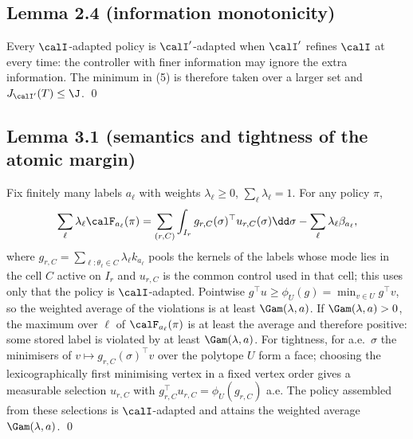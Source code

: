 \subsection{Lemma 2.4 (information monotonicity)}
Every $\calI$-adapted policy is $\calI'$-adapted when $\calI'$ refines $\calI$ at every time: the controller with finer information may ignore the extra information. The minimum in (5) is therefore taken over a larger set and $J_{\calI'}(T)\le\J$. \qed

\subsection{Lemma 3.1 (semantics and tightness of the atomic margin)}
Fix finitely many labels $a_\ell$ with weights $\lambda_\ell\ge0$, $\sum_\ell\lambda_\ell=1$. For any policy $\pi$,
\[
\sum_\ell\lambda_\ell\calF_{a_\ell}(\pi)=\sum_{(r,C)}\int_{I_r}g_{r,C}(\sigma)^\top u_{r,C}(\sigma)\dd\sigma-\sum_\ell\lambda_\ell\beta_{a_\ell},
\]
where $g_{r,C}=\sum_{\ell:\theta_\ell\in C}\lambda_\ell k_{a_\ell}$ pools the kernels of the labels whose mode lies in the cell $C$ active on $I_r$ and $u_{r,C}$ is the common control used in that cell; this uses only that the policy is $\calI$-adapted. Pointwise $g^\top u\ge\phi_U(g)=\min_{v\in U}g^\top v$, so the weighted average of the violations is at least $\Gam(\lambda,a)$. If $\Gam(\lambda,a)>0$, the maximum over $\ell$ of $\calF_{a_\ell}(\pi)$ is at least the average and therefore positive: some stored label is violated by at least $\Gam(\lambda,a)$. For tightness, for a.e.\ $\sigma$ the minimisers of $v\mapsto g_{r,C}(\sigma)^\top v$ over the polytope $U$ form a face; choosing the lexicographically first minimising vertex in a fixed vertex order gives a measurable selection $u_{r,C}$ with $g_{r,C}^\top u_{r,C}=\phi_U(g_{r,C})$ a.e. The policy assembled from these selections is $\calI$-adapted and attains the weighted average $\Gam(\lambda,a)$. \qed

